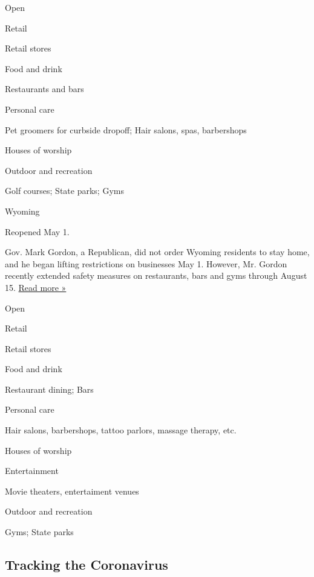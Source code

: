 Open

Retail

Retail stores

Food and drink

Restaurants and bars

Personal care

Pet groomers for curbside dropoff; Hair salons, spas, barbershops

Houses of worship

Outdoor and recreation

Golf courses; State parks; Gyms

Wyoming

Reopened May 1.

Gov. Mark Gordon, a Republican, did not order Wyoming residents to stay
home, and he began lifting restrictions on businesses May 1. However,
Mr. Gordon recently extended safety measures on restaurants, bars and
gyms through August 15.
\href{https://cowboystatedaily.com/2020/05/07/gordon-opens-wyoming-restaurants-and-bars-by-may-15/}{Read
more »}

Open

Retail

Retail stores

Food and drink

Restaurant dining; Bars

Personal care

Hair salons, barbershops, tattoo parlors, massage therapy, etc.

Houses of worship

Entertainment

Movie theaters, entertaiment venues

Outdoor and recreation

Gyms; State parks

\hypertarget{tracking-the-coronavirus}{%
\subsection{Tracking the Coronavirus}\label{tracking-the-coronavirus}}

